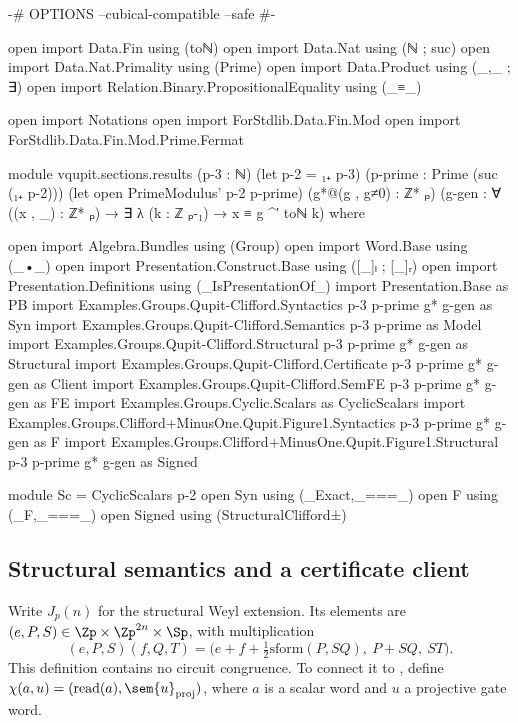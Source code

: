 \begin{code}[hide]
{-# OPTIONS --cubical-compatible --safe #-}

open import Data.Fin using (toℕ)
open import Data.Nat using (ℕ ; suc)
open import Data.Nat.Primality using (Prime)
open import Data.Product using (_,_ ; ∃)
open import Relation.Binary.PropositionalEquality using (_≡_)

open import Notations
open import ForStdlib.Data.Fin.Mod
open import ForStdlib.Data.Fin.Mod.Prime.Fermat

module vqupit.sections.results
  (p-3 : ℕ)
  (let p-2 = ₁₊ p-3)
  (p-prime : Prime (suc (₁₊ p-2)))
  (let open PrimeModulus' p-2 p-prime)
  (g*@(g , g≠0) : ℤ* ₚ)
  (g-gen : ∀ ((x , _) : ℤ* ₚ) → ∃ λ (k : ℤ ₚ-₁) → x ≡ g ^′ toℕ k)
  where

open import Algebra.Bundles using (Group)
open import Word.Base using (_•_)
open import Presentation.Construct.Base using ([_]ₗ ; [_]ᵣ)
open import Presentation.Definitions using (_IsPresentationOf_)
import Presentation.Base as PB
import Examples.Groups.Qupit-Clifford.Syntactics
  p-3 p-prime g* g-gen as Syn
import Examples.Groups.Qupit-Clifford.Semantics p-3 p-prime as Model
import Examples.Groups.Qupit-Clifford.Structural
  p-3 p-prime g* g-gen as Structural
import Examples.Groups.Qupit-Clifford.Certificate
  p-3 p-prime g* g-gen as Client
import Examples.Groups.Qupit-Clifford.SemFE
  p-3 p-prime g* g-gen as FE
import Examples.Groups.Cyclic.Scalars as CyclicScalars
import Examples.Groups.Clifford+MinusOne.Qupit.Figure1.Syntactics
  p-3 p-prime g* g-gen as F
import Examples.Groups.Clifford+MinusOne.Qupit.Figure1.Structural
  p-3 p-prime g* g-gen as Signed

module Sc = CyclicScalars p-2
open Syn using (_Exact,_===_)
open F using (_F,_===_)
open Signed using (StructuralClifford±)
\end{code}
\subsection{Structural semantics and a certificate client}\label{sec:structural}

Write $J_p(n)$ for the structural Weyl extension. Its elements are
$(e,P,S)\in\Zp\times\Zp^{2n}\times\Sp$, with multiplication
\[
(e,P,S)(f,Q,T)=
\bigl(e+f+\tfrac12\mathrm{sform}(P,SQ),\ P+SQ,\ ST\bigr).
\]
This definition contains no circuit congruence. To connect it to
, define $\chi(a,u)=(\mathrm{read}(a),\sem{u}_{\rm proj})$,
where $a$ is a scalar word and $u$ a projective gate word.

